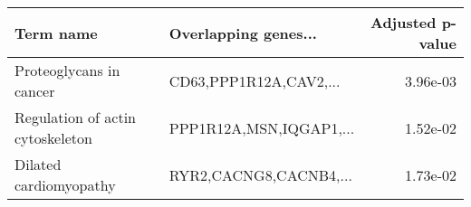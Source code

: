 \begin{tabular}{llr}
\toprule
                       Term name &    Overlapping genes... &  Adjusted p-value \\
\midrule
         Proteoglycans in cancer &  CD63,PPP1R12A,CAV2,... &          3.96e-03 \\
Regulation of actin cytoskeleton & PPP1R12A,MSN,IQGAP1,... &          1.52e-02 \\
          Dilated cardiomyopathy &  RYR2,CACNG8,CACNB4,... &          1.73e-02 \\
\bottomrule
\end{tabular}
